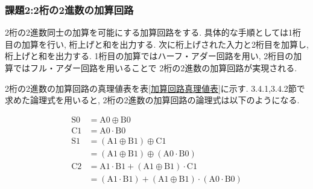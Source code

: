 \documentclass[a4paper, 11pt, uplatex]{jsarticle}
\begin{document}
\subsubsection{課題2:2桁の2進数の加算回路}
2桁の2進数同士の加算を可能にする加算回路をする. 具体的な手順としては1桁目の加算を行い,  桁上げと和を出力する.
次に桁上げされた入力と2桁目を加算し,  桁上げと和を出力する. 1桁目の加算ではハーフ・アダー回路を用い,  2桁目の加算ではフル・アダー回路を用いることで
2桁の2進数の加算回路が実現される.

2桁の2進数の加算回路の真理値表を表\ref{加算回路真理値表}に示す.
3.4.1,3.4.2節で求めた論理式を用いると, 2桁の2進数の加算回路の論理式は以下のようになる.

\begin{align}
  \mathrm{S0} &= \mathrm{A0} \oplus \mathrm{B0} \\
  \mathrm{C1} &= \mathrm{A0} \cdot \mathrm{B0} \\
  \mathrm{S1} &= (\mathrm{A1} \oplus \mathrm{B1}) \oplus \mathrm{C1} \\
              &= (\mathrm{A1} \oplus \mathrm{B1}) \oplus (\mathrm{A0} \cdot \mathrm{B0})\\
  \mathrm{C2} &= \mathrm{A1} \cdot \mathrm{B1} + (\mathrm{A1} \oplus \mathrm{B1}) \cdot \mathrm{C1} \\
              &= (\mathrm{A1} \cdot \mathrm{B1}) + (\mathrm{A1} \oplus \mathrm{B1}) \cdot (\mathrm{A0} \cdot \mathrm{B0}) \\
\end{align}
\end{document}
